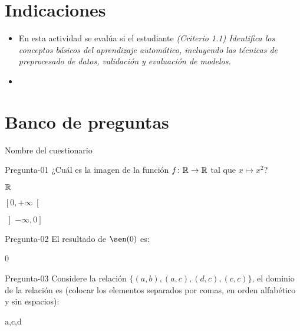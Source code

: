 \documentclass[a4,11pt]{aleph-notas}
\begin{document}
\encabezado

\vspace*{-8mm}
\section{Indicaciones}

\begin{itemize}[leftmargin=*]
\item 
    En esta actividad se evalúa si el estudiante \textit{(Criterio 1.1) Identifica los conceptos básicos del aprendizaje automático, incluyendo las técnicas de preprocesado de datos, validación y evaluación de modelos.}
\item
    
\end{itemize}

\section{Banco de preguntas}

\begin{quiz}{Nombre del cuestionario}

\begin{multi}[%
    feedback={La respuesta correcta es $\left[0,+\infty\right[$}
    ]%
    {Pregunta-01}
    ¿Cuál es la imagen de la función $f\colon \mathbb{R} \rightarrow \mathbb{R}$ tal que $x\mapsto x^2$?
    \item $\mathbb{R}$
    \item* $\left[0,+\infty\right[$
    \item $\left]-\infty,0\right]$
\end{multi}

\begin{numerical}[tolerance=0.1,%
    feedback={Se tiene que $\sen(0)=1$.}
    ]%
    {Pregunta-02}
    El resultado de $\sen(0)$ es:
    \item 0
\end{numerical}

\begin{shortanswer}[%
    feedback={El dominio de la relación es $\{a,c,d\}$}
    ]%
    {Pregunta-03}
    Considere la relación $\{(a,b), (a,c), (d,c), (c,c)\}$, el dominio de la relación es (colocar los elementos separados por comas, en orden alfabético y sin espacios):
    \item a,c,d
\end{shortanswer}

\end{quiz}
\end{document}
